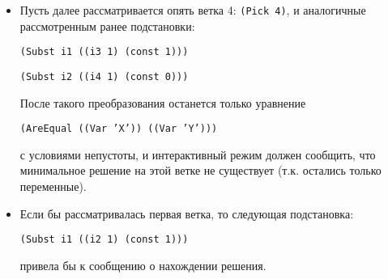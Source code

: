 \documentclass[12pt]{article}
\begin{document}
\begin{itemize}
\begin{enumerate}
\begin{verbatim}
 (('B' 3) (Var 'Y') ('B' 4))
)
(
  (OR (not empty (Var 'X')))
  (OR (not empty (Var 'Y')))
  (OR (not ('B' 1) ends (Var 'X'))
  (OR (not ('B' 2) ends (Var 'X'))
  (OR (not ('B' 3) ends (Var 'X'))
  (OR (not ('B' 4) ends (Var 'X'))
  (OR (not ('B' 1) starts (Var 'X'))
  (OR (not ('B' 2) starts (Var 'X'))
  (OR (not ('B' 3) starts (Var 'X'))
  (OR (not ('B' 4) starts (Var 'X'))
  (OR (not ('B' 1) ends (Var 'Y'))
  (OR (not ('B' 2) ends (Var 'Y'))
  (OR (not ('B' 3) ends (Var 'Y'))
  (OR (not ('B' 4) ends (Var 'Y'))
  (OR (not ('B' 1) starts (Var 'Y'))
  (OR (not ('B' 2) starts (Var 'Y'))
  (OR (not ('B' 3) starts (Var 'Y'))
  (OR (not ('B' 4) starts (Var 'Y'))
)
 (('B' 1) is (('B' 0) (i1 1) (const 0))) 
 (('B' 2) is (('B' 0) (i2 1) (const 0))) 
 (('B' 3) is (('B' 0) (i3 1) (const 1))) 
 (('B' 4) is (('B' 0) (i4 1) (const 0))) 
)
\end{verbatim}

\end{enumerate}
\item Пусть далее рассматривается опять ветка 4: \texttt{(Pick 4)}, и аналогичные рассмотренным ранее подстановки:

\texttt{(Subst i1 ((i3 1) (const 1)))}

\texttt{(Subst i2 ((i4 1) (const 0)))}

После такого преобразования останется только уравнение 

\texttt{(AreEqual ((Var 'X')) ((Var 'Y')))} 

с условиями непустоты, и интерактивный режим должен сообщить, что минимальное решение на этой ветке не существует (т.к. остались только переменные).

\item Если бы рассматривалась первая ветка, то следующая подстановка:

\texttt{(Subst i1 ((i2 1) (const 1)))}

привела бы к сообщению о нахождении решения.
\end{itemize}
\end{document}
